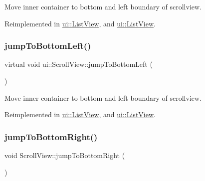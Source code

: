 Move inner container to bottom and left boundary of scrollview. 

Reimplemented in \hyperlink{classui_1_1ListView_a001320a34234f830a4f35096ceb86d48}{ui\+::\+List\+View}, and \hyperlink{classui_1_1ListView_a298f184bd6a527a03e8a3f28ec20fc6a}{ui\+::\+List\+View}.

\mbox{\label{classui_1_1ScrollView_ac8e5642982c561796291b17dafc6dbb7}} 
\subsubsection{\texorpdfstring{jump\+To\+Bottom\+Left()}{jumpToBottomLeft()}\hspace{0.1cm}{\footnotesize\ttfamily [2/2]}}
{\footnotesize\ttfamily virtual void ui\+::\+Scroll\+View\+::jump\+To\+Bottom\+Left (\begin{DoxyParamCaption}{ }\end{DoxyParamCaption})\hspace{0.3cm}{\ttfamily [virtual]}}

Move inner container to bottom and left boundary of scrollview. 

Reimplemented in \hyperlink{classui_1_1ListView_a001320a34234f830a4f35096ceb86d48}{ui\+::\+List\+View}, and \hyperlink{classui_1_1ListView_a298f184bd6a527a03e8a3f28ec20fc6a}{ui\+::\+List\+View}.

\mbox{\label{classui_1_1ScrollView_a71e1de6f85955a4d4b96931244bffd22}} 
\subsubsection{\texorpdfstring{jump\+To\+Bottom\+Right()}{jumpToBottomRight()}\hspace{0.1cm}{\footnotesize\ttfamily [1/2]}}
{\footnotesize\ttfamily void Scroll\+View\+::jump\+To\+Bottom\+Right (\begin{DoxyParamCaption}{ }\end{DoxyParamCaption})\hspace{0.3cm}{\ttfamily [virtual]}}

